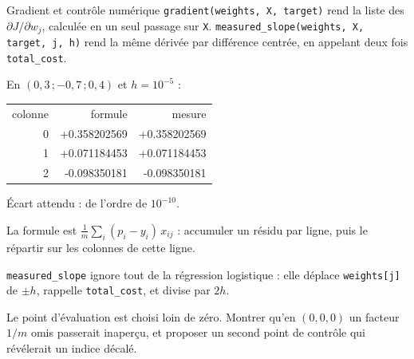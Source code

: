 \begin{tache}{Gradient et contrôle numérique}
 \texttt{gradient(weights, X, target)} rend la liste des
$\partial J/\partial w_j$, calculée en un seul passage sur \texttt{X}.
\texttt{measured\_slope(weights, X, target, j, h)} rend la même dérivée par
différence centrée, en appelant deux fois \texttt{total\_cost}.

 En $(0{,}3\,;-0{,}7\,;0{,}4)$ et $h=10^{-5}$ :
\begin{center}\ttfamily\footnotesize
\begin{tabular}{@{}rrr@{}}
colonne & formule & mesure\\
0 & +0.358202569 & +0.358202569\\
1 & +0.071184453 & +0.071184453\\
2 & -0.098350181 & -0.098350181\\
\end{tabular}
\end{center}
Écart attendu : de l'ordre de $10^{-10}$.

 La formule est
$\frac{1}{m}\sum_i (p_i-y_i)\,x_{ij}$ : accumuler un résidu par ligne, puis le
répartir sur les colonnes de cette ligne.

 \texttt{measured\_slope} ignore tout de la régression
logistique : elle déplace \texttt{weights[j]} de $\pm h$, rappelle
\texttt{total\_cost}, et divise par $2h$.

 Le point d'évaluation est choisi loin de zéro. Montrer qu'en
$(0,0,0)$ un facteur $1/m$ omis passerait inaperçu, et proposer un second point
de contrôle qui révélerait un indice décalé.
\end{tache}

